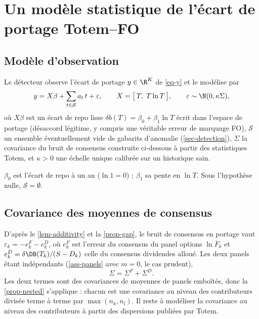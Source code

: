 \section{Un modèle statistique de l'écart de portage Totem--FO}\label{sec-noise}

\subsection{Modèle d'observation}
\begin{definition}\label{def-obs}
Le détecteur observe l'écart de portage $y\in\R^K$ de \cref{eq-y} et le modélise par
\begin{equation}\label{eq-obs}
y=X\beta+\sum_{t\in\mathcal{S}}a_t\,t+\varepsilon,\qquad X=\bigl[\,T,\;T\ln T\,\bigr],\qquad\varepsilon\sim\N(0,\kappa\Sigma),
\end{equation}
où $X\beta$ est un écart de repo lisse $\delta b(T)=\beta_0+\beta_1\ln T$ écrit dans l'espace de portage (désaccord
légitime, y compris une véritable erreur de marquage FO), $\mathcal{S}$ un ensemble éventuellement vide de gabarits
d'anomalie (\cref{sec-detection}), $\Sigma$ la covariance du bruit de consensus construite ci-dessous à partir des
statistiques Totem, et $\kappa>0$ une échelle unique calibrée sur un historique sain.
\end{definition}
$\beta_0$ est l'écart de repo à un an ($\ln1=0$) ; $\beta_1$ sa pente en $\ln T$. Sous l'hypothèse nulle,
$\mathcal{S}=\emptyset$.

\subsection{Covariance des moyennes de consensus}
D'après le \cref{lem-additivity} et la \cref{prop-gap}, le bruit de consensus en portage vaut
$\varepsilon_k=-e^F_k-e^D_k$, où $e^F_k$ est l'erreur du consensus du panel options $\ln\overline{F}_k$ et
$e^D_k=\delta\DB(T_k)/(S-D_k)$ celle du consensus dividendes alloué. Les deux panels étant indépendants
(\cref{ass-panels} avec $m=0$, le cas prudent),
\begin{equation}\label{eq-sigma}
\Sigma=\Sigma^F+\Sigma^D.
\end{equation}
Les deux termes sont des covariances de moyennes de panels emboîtés, donc la \cref{prop-nested} s'applique : chacun est
une covariance au niveau des contributeurs divisée terme à terme par $\max(n_k,n_l)$. Il reste à modéliser la
covariance au niveau des contributeurs à partir des dispersions publiées par Totem.

